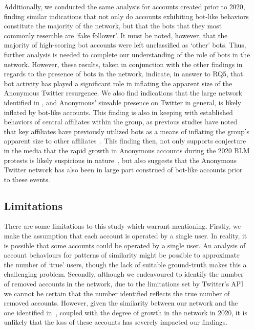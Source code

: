 \documentclass[letterpaper]{article}
\begin{document}
Additionally, we conducted the same analysis for accounts created prior to 2020, finding similar indications that not only do accounts exhibiting bot-like behaviors constitute the majority of the network, but that the bots that they most commonly resemble are `fake follower'. It must be noted, however, that the majority of high-scoring bot accounts were left unclassified as `other' bots. Thus, further analysis is needed to complete our understanding of the role of bots in the network.  However, these results, taken in conjunction with the other findings in regards to the presence of bots in the network, indicate, in answer to RQ5, that bot activity has played a significant role in inflating the apparent size of the Anonymous Twitter resurgence. We also find indications that the large network identified in \cite{Jones2020}, and Anonymous' sizeable presence on Twitter in general, is likely inflated by bot-like accounts. This finding is also in keeping with established behaviors of central affiliates within the group, as previous studies have noted that key affiliates have previously utilized bots as a means of inflating the group's apparent size to other affiliates~\cite{Olson2013}. This finding then, not only supports conjecture in the media that the rapid growth in Anonymous accounts during the 2020 BLM protests is likely suspicious in nature~\cite{Telegraph2020}, but also suggests that the Anonymous Twitter network has also been in large part construed of bot-like accounts prior to these events.

\subsection{Limitations}

There are some limitations to this study which warrant mentioning. Firstly, we make the assumption that each account is operated by a single user. In reality, it is possible that some accounts could be operated by a single user. An analysis of account behaviours for patterns of similarity might be possible to approximate the number of `true' users, though the lack of suitable ground-truth makes this a challenging problem.  Secondly, although we endeavoured to identify the number of removed accounts in the network, due to the limitations set by Twitter's API we cannot be certain that the number identified reflects the true number of removed accounts. However, given the similarity between our network and the one identified in~\cite{Jones2020}, coupled with the degree of growth in the network in 2020, it is unlikely that the loss of these accounts has severely impacted our findings.
\end{document}
